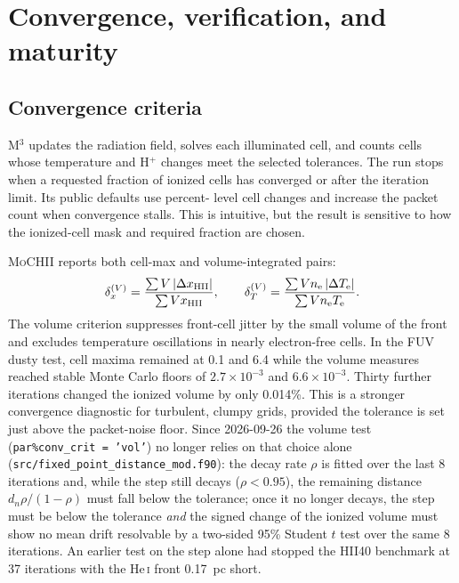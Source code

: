 \documentclass[english,a4paper]{my_memo}
\newcommand{\code}[1]{\texttt{#1}}
\newcommand{\MoCHII}{\textsc{MoCHII}}
\newcommand{\Mthree}{M$^3$}
\newcommand{\HeI}{He\,\textsc{i}}
\newcommand{\Te}{T_{\rm e}}
\newcommand{\nelec}{n_{\rm e}}
\begin{document}
\section{Convergence, verification, and maturity}

\subsection{Convergence criteria}

\Mthree{} updates the radiation field, solves each illuminated cell, and
counts cells whose temperature and H$^+$ changes meet the selected
tolerances.  The run stops when a requested fraction of ionized cells has
converged or after the iteration limit.  Its public defaults use percent-
level cell changes and increase the packet count when convergence stalls.
This is intuitive, but the result is sensitive to how the ionized-cell
mask and required fraction are chosen.

\MoCHII{} reports both cell-max and volume-integrated pairs:
\begin{equation}
 \delta_x^{(V)} =
 \frac{\sum V\,|\Delta x_{\rm HII}|}{\sum V x_{\rm HII}},
 \qquad
 \delta_T^{(V)} =
 \frac{\sum V\nelec\,|\Delta\Te|}{\sum V\nelec\Te}.
 \label{eq:conv}
\end{equation}
The volume criterion suppresses front-cell jitter by the small volume of
the front and excludes temperature oscillations in nearly electron-free
cells.  In the FUV dusty test, cell maxima remained at 0.1 and 6.4 while
the volume measures reached stable Monte Carlo floors of
$2.7\times10^{-3}$ and $6.6\times10^{-3}$.  Thirty further iterations
changed the ionized volume by only 0.014\%.  This is a stronger convergence
diagnostic for turbulent, clumpy grids, provided the tolerance is set just
above the packet-noise floor.  Since 2026-09-26 the volume test
(\code{par\%conv\_crit = 'vol'}) no longer relies on that choice alone
(\code{src/fixed\_point\_distance\_mod.f90}): the decay rate $\rho$ is fitted
over the last 8 iterations and, while the step still decays ($\rho < 0.95$),
the remaining distance $d_n\rho/(1-\rho)$ must fall below the tolerance; once it
no longer decays, the step must be below the tolerance \emph{and} the signed
change of the ionized volume must show no mean drift resolvable by a
two-sided 95\% Student $t$ test over the same 8 iterations.  An earlier test
on the step alone had stopped the HII40 benchmark at 37 iterations with the
\HeI{} front 0.17~pc short.
\end{document}
